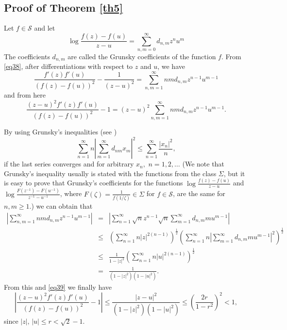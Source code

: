 \documentclass[a4paper,12pt]{amsart}
\theoremstyle{definition}
\begin{document}
\subsection{Proof of Theorem \ref{th5}}
Let $f\in\mathcal{S}$ and let
\begin{equation}\label{eq38}
\log \frac{f(z)-f(u)}{z-u}=\sum_{n,m=0}^{\infty}d_{n,m}z^{n}u^{m}
\end{equation}
The coefficients  $d_{n,m}$ are called the Grunsky coefficients of the function $f$.  From \eqref{eq38}, after differentiations
with respect to $z$ and $u$, we have
$$\frac{f'(z)f'(u)}{(f(z)-f(u))^{2}}-\frac{1}{(z-u)^{2}}=\sum_{n,m=1}^{\infty}nmd_{n,m}z^{n-1}u^{m-1}$$
 and from here
\begin{equation}\label{eq39}
\frac{(z-u)^{2}f'(z)f'(u)}{(f(z)-f(u))^{2}}-1=(z-u)^{2}\sum_{n,m=1}^{\infty}nmd_{n,m}z^{n-1}u^{m-1}.
\end{equation}

By using  Grunsky's inequalities (see \cite[p.~62]{P})
\begin{equation}\label{eq 40}
\sum_{n=1}^{\infty}n\left|\sum_{m=1}^{\infty}d_{nm}x_{m}\right|^{2}\leq \sum_{n=1}^{\infty}\frac{|x_{n}|^{2}}{n},
\end{equation}
if the last series converges and for arbitrary $x_{n},\,\,n=1,2,\ldots $
(We note that Grunsky's inequality usually is stated with the functions from the class $\Sigma $, but it is easy
to prove that Grunsky's coefficients for the functions $\log \frac{f(z)-f(u)}{z-u}$ and
$\log \frac{F(z^{-1})-F(u^{-1})}{z^{-1}-u^{-1}}$, where $F(\zeta)=\frac{1}{f(1/\zeta)}\in \Sigma $ for
$f\in \mathcal{S}$, are  the same for $n,m\geq 1.$) we can obtain that
\begin{eqnarray*}
\left|\sum_{n,m=1}^{\infty}nmd_{n,m}z^{n-1}u^{m-1}\right|
&=& \left|\sum_{n=1}^{\infty}\sqrt{n}z^{n-1}\sqrt{n}\sum_{m=1}^{\infty}d_{n,m}mu^{m-1}\right|\\
&\leq& \left(\sum_{n=1}^{\infty}n|z|^{2(n-1)}\right)^{\frac{1}{2}}
\left(\sum_{n=1}^{\infty}n\left|\sum_{m=1}^{\infty}d_{n,m}mu^{m-1}\right|^{2}\right)^{\frac{1}{2}}\\
&\leq& \frac{1}{1-|z|^{2}}\left(\sum_{n=1}^{\infty}n|u|^{2(n-1)}\right)^{\frac{1}{2}}\\
&=&\frac{1}{(1-|z|^{2})(1-|u|^{2})}.
\end{eqnarray*}
From this and \eqref{eq39} we finally have
$$\left| \frac{(z-u)^{2}f'(z)f'(u)}{(f(z)-f(u))^{2}}-1\right|\leq \frac{|z-u|^{2}}{(1-|z|^{2})(1-|u|^{2})}
\leq \left(\frac{2r}{1-r^{2}}\right)^{2}<1,
$$
since $|z|,\, |u|\leq r<\sqrt{2}-1.$
\end{document}
